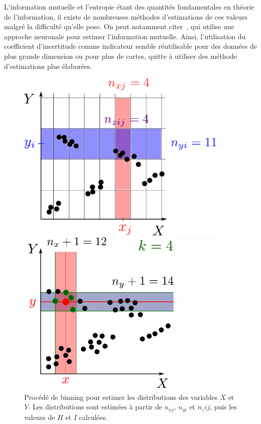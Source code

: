 L'information mutuelle et l'entropie étant des quantités fondamentales en théorie de l'information, il existe de nombreuses méthodes d'estimations de ces valeurs malgré la difficulté qu'elle pose. On peut notamment citer~\cite{Belghazi2018MutualIN}, qui utilise une approche neuronale pour estimer l'information mutuelle. Ainsi, l'utilisation du coefficient d'incertitude comme indicateur semble réutilisable pour des données de plus grande dimension ou pour plus de cartes, quitte à utiliser des méthode d'estimations plus élaborées. 

\begin{figure}
\begin{minipage}{0.45\textwidth}
\centering
\includegraphics[width=0.9\textwidth]{boxes}
\caption{Procédé de binning pour estimer les distributions des variables $X$ et $Y$. Les distributions sont estimées à partir de $n_{xj}$, $n_{yi}$ et $n_z{ij}$, puis les valeurs de $H$ et $I$ calculées.}
\label{fig:binning} 
\end{minipage}
\hfill
\begin{minipage}{0.45\textwidth}
\centering
\includegraphics[width=0.7\textwidth]{kraskov}

\end{minipage}
\end{figure}
